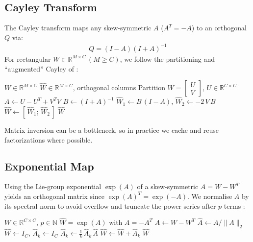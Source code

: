 \documentclass[10pt]{article}
\theoremstyle{plain}
\theoremstyle{definition}
\theoremstyle{remark}
\begin{document}
\subsection{Cayley Transform}

The Cayley transform \cite{Cayley_1846} maps any skew-symmetric \(A\) (\(A^T=-A\)) to an orthogonal \(Q\) via:
\begin{align*}
    Q = (I - A)(I + A)^{-1}
\end{align*}
For rectangular \(W\in\mathbb{R}^{M\times C}\,(M\ge C)\), we follow the partitioning and “augmented” Cayley of \cite{pauli2023lipschitz}:

\begin{algorithm}[H]
\begin{algorithmic}[1]
\Require \(W\in\mathbb{R}^{M\times C}\)
\Ensure \(\hat W\in\mathbb{R}^{M\times C}\), orthogonal columns
    \State Partition \(W = \begin{bmatrix}U\\V\end{bmatrix}\), \(U\in\mathbb{R}^{C\times C}\)
    \State \(A \gets U - U^T + V^T V\) 
    \State \(B \gets (I + A)^{-1}\)
    \State \(\hat W_1 \gets B\,(I - A)\), \(\hat W_2 \gets -2\,V\,B\)
    \State \(\hat W \gets [\,\hat W_1;\,\hat W_2\,]\)
    \State \Return \(\hat W\)
\EndProcedure
\end{algorithmic}
\caption{Augmented Cayley Transform}
\label{alg:cayley}
\end{algorithm}

Matrix inversion can be a bottleneck, so in practice we cache and reuse factorizations where possible.

\subsection{Exponential Map}

Using the Lie-group exponential \(\exp(A)\) of a skew-symmetric \(A=W-W^T\) yields an orthogonal matrix since \(\exp(A)^T = \exp(-A)\).  We normalise \(A\) by its spectral norm to avoid overflow and truncate the power series after \(p\) terms \cite{singla_skew_2021}:

\begin{algorithm}[H]
\begin{algorithmic}[1]
\Require \(W\in\mathbb{R}^{C\times C}\), \(p\in\mathbb{N}\)
\Ensure \(\hat W = \exp(A)\) with \(A=-A^T\)
    \State \(A \gets W - W^T\)
    \State \(\hat A \gets A / \|A\|_2\) 
    \State \(\hat W \gets I_C\), \(\hat A_k \gets I_C\)
        \State \(\hat A_k \gets \frac1k\,\hat A_k\,\hat A\)
        \State \(\hat W \gets \hat W + \hat A_k\)
    \EndFor
    \State \Return \(\hat W\)
\EndProcedure
\end{algorithmic}
\caption{Exponential Map with Spectral Normalization}
\label{alg:EXP}
\end{algorithm}
\end{document}
